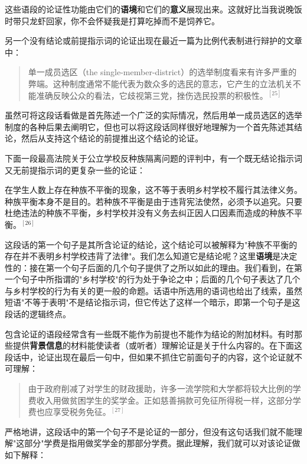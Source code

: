 这些语段的论证性功能由它们的\textbf{语境}和它们的\textbf{意义}展现出来。这就好比当我说晚饭时带只龙虾回家，你不会怀疑我是打算吃掉而不是饲养它。

另一个没有结论或前提指示词的论证出现在最近一篇为比例代表制进行辩护的文章中：

\begin{quotation}
单一成员选区（the single-member-district）的选举制度看来有许多严重的弊端。这种制度通常不能代表为数众多的选民的意志，它产生的立法机关不能准确反映公众的看法，它歧视第三党，挫伤选民投票的积极性。${}^{[25]}$
\end{quotation}

虽然可将这段话看做是首先陈述一个广泛的实际情况，然后用单一成员选区的选举制度的各种后果去阐明它，但也可以将这段话同样很好地理解为一个首先陈述其结论，然后从支持这个结论的前提推出这个结论的论证。

下面一段最高法院关于公立学校反种族隔离问题的评判中，有一个既无结论指示词又无前提指示词的更复杂一些的论证：

\begin{displayquote}
在学生人数上存在种族不平衡的现象，这不等于表明乡村学校不履行其法律义务。种族平衡本身不是目的。若种族不平衡是由于违背宪法使然，必须予以追究。只要杜绝违法的种族不平衡，乡村学校并没有义务去纠正因人口因素而造成的种族不平衡。${}^{[26]}$
\end{displayquote}

这段话的第一个句子是其所含论证的结论，这个结论可以被解释为"种族不平衡的存在并不表明乡村学校违背了法律"。我们怎么知道它是结论呢？这里\textbf{语境}是决定性的：接在第一个句子后面的几个句子提供了之所以如此的理由。我们看到，在第一个句子中所指谓的"乡村学校"的行为处于争论之中；后面的几个句子表达了几个与乡村学校的行为有关的更一般的命题。话语中所选用的语词也给出了线索，虽然短语"不等于表明"不是结论指示词，但它传达了这样一个暗示，即第一个句子是这段话的逻辑终点。

包含论证的语段经常含有一些既不能作为前提也不能作为结论的附加材料。有时那些提供\textbf{背景信息}的材料能使读者（或听者）理解论证是关于什么内容的。在下面这段话中，论证出现在最后一句中，但如果不抓住它前面句子的内容，这个论证就不可理解：

\begin{quotation}
由于政府削减了对学生的财政援助，许多一流学院和大学都将较大比例的学费收入用做贫困学生的奖学金。正如慈善捐款可免征所得税一样，这部分学费也应享受税务免征。${}^{[27]}$
\end{quotation}

严格地讲，这段话中的第一个句子不是论证的一部分，但没有这句话我们就不能理解"这部分"学费是指用做奖学金的那部分学费。据此理解，我们就可以对该论证做如下解释：

